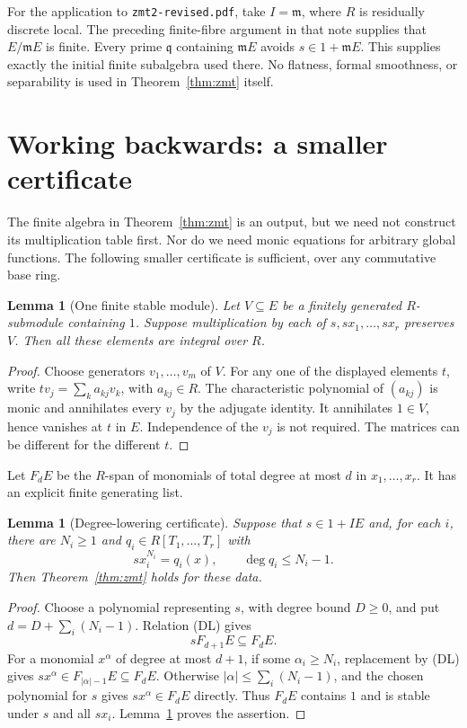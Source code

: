 \documentclass[11pt]{amsart}
\newtheorem{lemma}[theorem]{Lemma}
\theoremstyle{definition}
\theoremstyle{remark}
\newcommand{\code}[1]{\texttt{#1}}
\begin{document}
For the application to \code{zmt2-revised.pdf}, take $I=\mathfrak m$,
where $R$ is residually discrete local. The preceding finite-fibre
argument in that note supplies that $E/\mathfrak m E$ is finite.
Every prime $\mathfrak q$ containing $\mathfrak m E$ avoids
$s\in1+\mathfrak m E$. This supplies exactly the initial finite
subalgebra used there. No flatness, formal smoothness, or separability
is used in Theorem~\ref{thm:zmt} itself.

\section{Working backwards: a smaller certificate}\label{sec:backwards}

The finite algebra in Theorem~\ref{thm:zmt} is an output, but we need
not construct its multiplication table first. Nor do we need monic
equations for arbitrary global functions. The following smaller
certificate is sufficient, over any commutative base ring.

\begin{lemma}[One finite stable module]\label{lem:stable}
Let $V\subseteq E$ be a finitely generated $R$-submodule containing
$1$. Suppose multiplication by each of $s,sx_1,\ldots,sx_r$ preserves
$V$. Then all these elements are integral over $R$.
\end{lemma}
\begin{proof}
Choose generators $v_1,\ldots,v_m$ of $V$. For any one of the displayed
elements $t$, write $tv_j=\sum_k a_{kj}v_k$, with $a_{kj}\in R$.
The characteristic polynomial of $(a_{kj})$ is monic and annihilates
every $v_j$ by the adjugate identity. It annihilates $1\in V$, hence
vanishes at $t$ in $E$. Independence of the $v_j$ is not required.
The matrices can be different for the different $t$.
\end{proof}

Let $F_dE$ be the $R$-span of monomials of total degree at most $d$
in $x_1,\ldots,x_r$. It has an explicit finite generating list.

\begin{lemma}[Degree-lowering certificate]\label{lem:lower}
Suppose that $s\in1+IE$ and, for each $i$, there are $N_i\geq1$ and
$q_i\in R[T_1,\ldots,T_r]$ with
\[
 s x_i^{N_i}=q_i(x),\qquad \deg q_i\leq N_i-1.
 \tag{DL}
\]
Then Theorem~\ref{thm:zmt} holds for these data.
\end{lemma}
\begin{proof}
Choose a polynomial representing $s$, with degree bound $D\geq0$,
and put $d=D+\sum_i(N_i-1)$. Relation (DL) gives
\[
 sF_{d+1}E\subseteq F_dE.
\]
For a monomial $x^\alpha$ of degree at most $d+1$, if some
$\alpha_i\geq N_i$, replacement by (DL) gives
$s x^\alpha\in F_{|\alpha|-1}E\subseteq F_dE$. Otherwise
$|\alpha|\leq\sum_i(N_i-1)$, and the chosen polynomial for $s$
gives $s x^\alpha\in F_dE$ directly. Thus $F_dE$ contains $1$
and is stable under $s$ and all $sx_i$.
Lemma~\ref{lem:stable} proves the assertion.
\end{proof}
\end{document}
